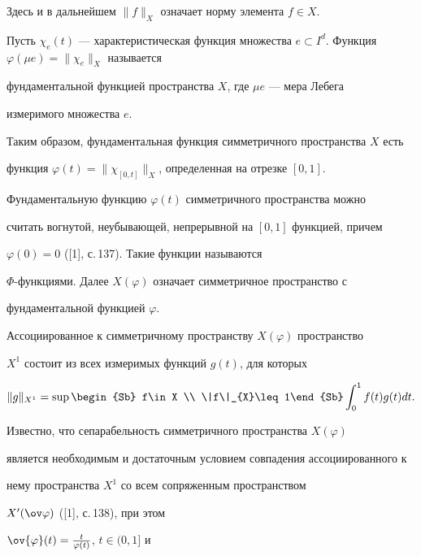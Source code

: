 Здесь и в дальнейшем $\|f\|_{X}$ означает норму элемента $f\in X$.





Пусть $\chi_{e}(t)$ --- характеристическая функция множества $e\subset 


I^{d}$. Функция $\varphi(\mu e)=\|\chi_{e}\|_{X}$ называется 


фундаментальной функцией пространства $X$, где  $\mu e$ --- мера Лебега 


измеримого множества $e$. 


Таким образом, фундаментальная функция симметричного пространства $X$ есть 


функция $\varphi(t)=\|\chi_{[0,t]}\|_{X}$, определенная на отрезке $[0,1]$. 


Фундаментальную функцию  $\varphi(t)$ симметричного пространства можно 


считать вогнутой, неубывающей, непрерывной на $[0,1]$ функцией, причем 


$\varphi(0)=0$ ([1], с.\,137). Такие функции называются


$\Phi$-функциями.  Далее $X(\varphi)$ означает симметричное пространство с 


фундаментальной функцией $\varphi$. 





Ассоциированное к симметричному пространству $X(\varphi)$  пространство 


$X^{1}$ состоит из всех измеримых функций $g(t)$, для которых


$$


\|g\|_{X^{1}}=\sup\begin{Sb} f\in X \\ \|f\|_{X}\leq 1\end{Sb}


\int_{0}^{1}f(t)g(t)dt.


$$





Известно, что сепарабельность симметричного пространства $X(\varphi)$ 


является необходимым и достаточным условием совпадения ассоциированного к 


нему пространства $X^{1}$ со всем сопряженным пространством 


$X'(\ov\varphi)$ ([1], с.\,138), при этом 


$\ov{\varphi}(t)=\frac{t}{\varphi(t)}$, $t\in (0,1]$ и 


